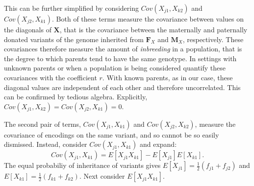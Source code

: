 \documentclass{article}
\newcommand{\m}[1]{\mathbf{#1}}               %
\begin{document}
This can be further simplified by considering $Cov(X_{j1}, X_{k2})$ and $Cov(X_{j2}, X_{k1})$. Both of these terms measure the covariance between values on the diagonals of $\m{X}$, that is the covariance between the maternally and paternally donated variants of the genome inherited from $\m{F}_X$ and $\m{M}_X$, respectively. These covariances therefore measure the amount of \emph{inbreeding} in a population, that is the degree to which parents tend to have the same genotype. In settings with unknown parents or when a population is being considered \cite{crowkimura1970intro} quantify these covariances with the coefficient $r$. With known parents, as in our case, these diagonal values are independent of each other and therefore uncorrelated. This can be confirmed by tedious algebra. Explicitly, $Cov(X_{j1}, X_{k2}) = Cov(X_{j2}, X_{k1}) = 0$. 

The second pair of terms, $Cov(X_{j1}, X_{k1})$ and $Cov(X_{j2}, X_{k2})$, measure the covariance of encodings on the same variant, and so cannot be so easily dismissed. Instead, consider $Cov(X_{j1}, X_{k1})$ and expand:
$$Cov(X_{j1}, X_{k1}) = E[X_{j1} X_{k1}] - E[X_{j1}]E[X_{k1}].$$
The equal probabiliy of inheritance of variants gives $E[X_{j1}] = \frac{1}{2}(f_{j1} + f_{j2})$ and $E[X_{k1}] = \frac{1}{2}(f_{k1} + f_{k2})$. Next consider $E[X_{j1} X_{k1}]$.
\end{document}
